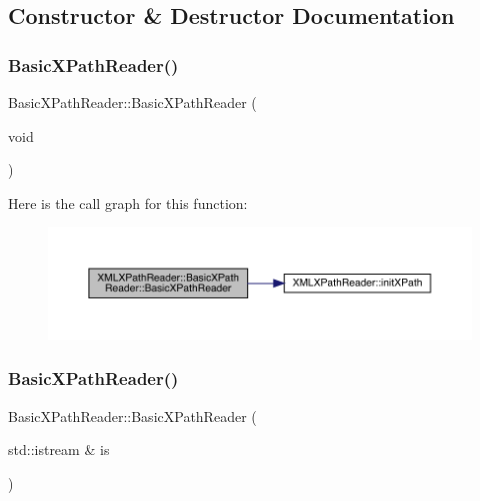 \subsection{Constructor \& Destructor Documentation}
\mbox{\label{classXMLXPathReader_1_1BasicXPathReader_a940138f7f52261b6190f2f23b73c648f}} 
\subsubsection{\texorpdfstring{BasicXPathReader()}{BasicXPathReader()}\hspace{0.1cm}{\footnotesize\ttfamily [1/12]}}
{\footnotesize\ttfamily Basic\+X\+Path\+Reader\+::\+Basic\+X\+Path\+Reader (\begin{DoxyParamCaption}\item[{void}]{ }\end{DoxyParamCaption})}

Here is the call graph for this function\+:\nopagebreak
\begin{figure}[H]
\begin{center}
\leavevmode
\includegraphics[width=350pt]{d6/dbf/classXMLXPathReader_1_1BasicXPathReader_a940138f7f52261b6190f2f23b73c648f_cgraph}
\end{center}
\end{figure}
\mbox{\label{classXMLXPathReader_1_1BasicXPathReader_ae50fd4b786cbc875ba1ca6e04a62815f}} 
\subsubsection{\texorpdfstring{BasicXPathReader()}{BasicXPathReader()}\hspace{0.1cm}{\footnotesize\ttfamily [2/12]}}
{\footnotesize\ttfamily Basic\+X\+Path\+Reader\+::\+Basic\+X\+Path\+Reader (\begin{DoxyParamCaption}\item[{std\+::istream \&}]{is }\end{DoxyParamCaption})}

